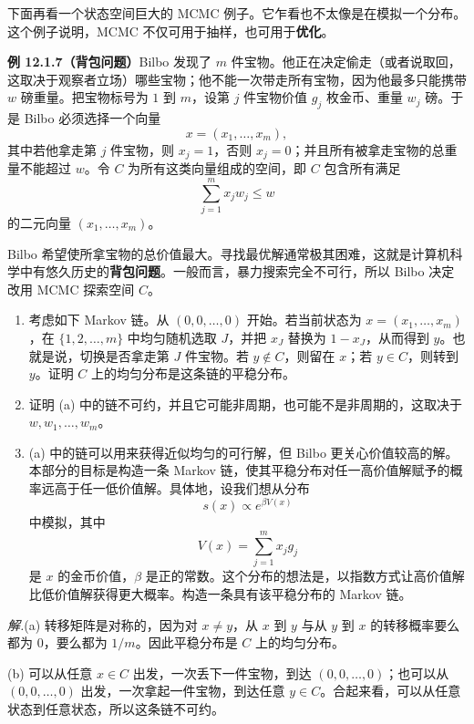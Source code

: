 \documentclass[UTF8,12pt,a4paper,fontset=fandol]{ctexart}
\begin{document}
下面再看一个状态空间巨大的 MCMC 例子。它乍看也不太像是在模拟一个分布。这个例子说明，MCMC 不仅可用于抽样，也可用于\textbf{优化}。

\noindent\textbf{例 12.1.7（背包问题）}\quad Bilbo 发现了 $m$ 件宝物。他正在决定偷走（或者说取回，这取决于观察者立场）哪些宝物；他不能一次带走所有宝物，因为他最多只能携带 $w$ 磅重量。把宝物标号为 $1$ 到 $m$，设第 $j$ 件宝物价值 $g_j$ 枚金币、重量 $w_j$ 磅。于是 Bilbo 必须选择一个向量
\[
  x=(x_1,\ldots,x_m),
\]
其中若他拿走第 $j$ 件宝物，则 $x_j=1$，否则 $x_j=0$；并且所有被拿走宝物的总重量不能超过 $w$。令 $C$ 为所有这类向量组成的空间，即 $C$ 包含所有满足
\[
  \sum_{j=1}^{m}x_jw_j\le w
\]
的二元向量 $(x_1,\ldots,x_m)$。

Bilbo 希望使所拿宝物的总价值最大。寻找最优解通常极其困难，这就是计算机科学中有悠久历史的\textbf{背包问题}。一般而言，暴力搜索完全不可行，所以 Bilbo 决定改用 MCMC 探索空间 $C$。

\begin{enumerate}
  \item[(a)] 考虑如下 Markov 链。从 $(0,0,\ldots,0)$ 开始。若当前状态为 $x=(x_1,\ldots,x_m)$，在 $\{1,2,\ldots,m\}$ 中均匀随机选取 $J$，并把 $x_J$ 替换为 $1-x_J$，从而得到 $y$。也就是说，切换是否拿走第 $J$ 件宝物。若 $y\notin C$，则留在 $x$；若 $y\in C$，则转到 $y$。证明 $C$ 上的均匀分布是这条链的平稳分布。

  \item[(b)] 证明 (a) 中的链不可约，并且它可能非周期，也可能不是非周期的，这取决于 $w,w_1,\ldots,w_m$。

  \item[(c)] (a) 中的链可以用来获得近似均匀的可行解，但 Bilbo 更关心价值较高的解。本部分的目标是构造一条 Markov 链，使其平稳分布对任一高价值解赋予的概率远高于任一低价值解。具体地，设我们想从分布
  \[
    s(x)\propto e^{\beta V(x)}
  \]
  中模拟，其中
  \[
    V(x)=\sum_{j=1}^{m}x_jg_j
  \]
  是 $x$ 的金币价值，$\beta$ 是正的常数。这个分布的想法是，以指数方式让高价值解比低价值解获得更大概率。构造一条具有该平稳分布的 Markov 链。
\end{enumerate}

\noindent\textit{解.}\quad (a) 转移矩阵是对称的，因为对 $x\ne y$，从 $x$ 到 $y$ 与从 $y$ 到 $x$ 的转移概率要么都为 $0$，要么都为 $1/m$。因此平稳分布是 $C$ 上的均匀分布。

(b) 可以从任意 $x\in C$ 出发，一次丢下一件宝物，到达 $(0,0,\ldots,0)$；也可以从 $(0,0,\ldots,0)$ 出发，一次拿起一件宝物，到达任意 $y\in C$。合起来看，可以从任意状态到任意状态，所以这条链不可约。
\end{document}
